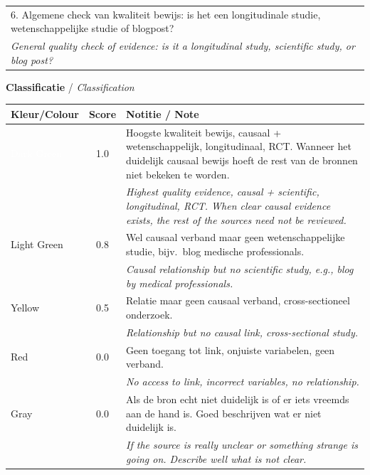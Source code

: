 \begin{table}[H]
\begin{tabular}{p{}}
6. Algemene check van kwaliteit bewijs: is het een longitudinale studie, wetenschappelijke studie of blogpost? \\
\textit{General quality check of evidence: is it a longitudinal study, scientific study, or blog post?} \\
\bottomrule
\end{tabular}

\vspace{1em}

\textbf{Classificatie} / \textit{Classification}

\vspace{0.5em}

\begin{tabular}{|p{2cm}|c|p{8cm}|}
\hline
\textbf{Kleur/Colour} & \textbf{Score} & \textbf{Notitie / Note} \\
\hline
\cellcolor{green!70!black}\textcolor{white}{Dark Green} & 1.0 & 
Hoogste kwaliteit bewijs, causaal + wetenschappelijk, longitudinaal, RCT. Wanneer het duidelijk causaal bewijs hoeft de rest van de bronnen niet bekeken te worden. \\
\cellcolor{green!70!black} & & \textit{Highest quality evidence, causal + scientific, longitudinal, RCT. When clear causal evidence exists, the rest of the sources need not be reviewed.} \\
\hline
\cellcolor{green!50} Light Green & 0.8 & 
Wel causaal verband maar geen wetenschappelijke studie, bijv.\ blog medische professionals. \\
\cellcolor{green!50} & & \textit{Causal relationship but no scientific study, e.g., blog by medical professionals.} \\
\hline
\cellcolor{yellow!80} Yellow & 0.5 & 
Relatie maar geen causaal verband, cross-sectioneel onderzoek. \\
\cellcolor{yellow!80} & & \textit{Relationship but no causal link, cross-sectional study.} \\
\hline
\cellcolor{red!70} Red & 0.0 & 
Geen toegang tot link, onjuiste variabelen, geen verband. \\
\cellcolor{red!70} & & \textit{No access to link, incorrect variables, no relationship.} \\
\hline
\cellcolor{gray!50} Gray & 0.0 & 
Als de bron echt niet duidelijk is of er iets vreemds aan de hand is. Goed beschrijven wat er niet duidelijk is. \\
\cellcolor{gray!50} & & \textit{If the source is really unclear or something strange is going on. Describe well what is not clear.} \\
\hline
\end{tabular}

\end{table}

